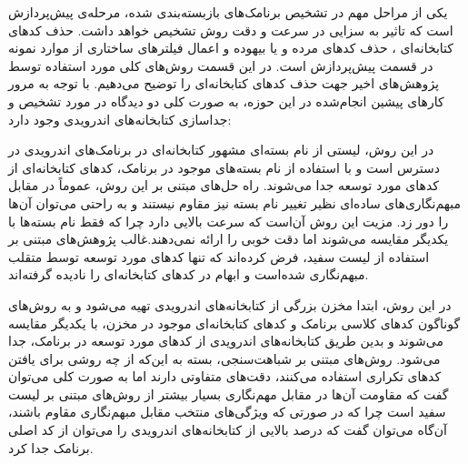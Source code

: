 یکی از مراحل مهم در تشخیص برنامک‌های بازبسته‌بندی شده، مرحله‌ی پیش‌پردازش  است که تاثیر به سزایی در سرعت و دقت روش تشخیص خواهد داشت. حذف کد‌های کتابخانه‌ای ، حذف کد‌های مرده و یا بیهوده و اعمال فیلتر‌های ساختاری از موارد نمونه در قسمت پیش‌پردازش است. در این قسمت روش‌های کلی مورد استفاده توسط پژوهش‌های اخیر جهت حذف کد‌های کتابخانه‌ای را توضیح می‌دهیم. با توجه به مرور کار‌های پیشین انجام‌شده در این حوزه، به صورت کلی دو دیدگاه در مورد تشخیص و جداسازی کتابخانه‌های اندرویدی وجود دارد:

  در این روش، لیستی از نام بسته‌ای مشهور کتابخانه‌ای در برنامک‌های اندرویدی در دسترس است و با استفاده از نام بسته‌های موجود در برنامک، کد‌های کتابخانه‌ای از کد‌های مورد توسعه جدا می‌شوند. راه‌ حل‌های مبتنی بر این روش، عموماً در مقابل مبهم‌نگاری‌های ساده‌ای نظیر تغییر نام بسته نیز مقاوم نیستند و به راحتی می‌توان آن‌ها را دور زد. مزیت این روش آن‌است که سرعت بالایی دارد چرا که فقط نام بسته‌ها با یکدیگر مقایسه می‌شوند اما دقت خوبی را ارائه نمی‌دهند.غالب پژوهش‌های مبتنی بر استفاده از لیست سفید، فرض کرده‌اند که تنها کد‌های مورد توسعه توسط متقلب مبهم‌نگاری شده‌است و ابهام در کد‌های کتابخانه‌ای را نادیده گرفته‌اند.

  در این روش، ابتدا مخزن بزرگی از کتابخانه‌های اندرویدی تهیه می‌شود و به روش‌های گوناگون کد‌های کلاسی برنامک و کد‌های کتابخانه‌ای موجود در مخزن، با یکدیگر مقایسه می‌شوند و بدین طریق کتابخانه‌های اندرویدی از کد‌های مورد توسعه در برنامک، جدا می‌شود. روش‌های مبتنی بر شباهت‌سنجی، بسته به این‌که از چه روشی برای یافتن کد‌های تکراری استفاده می‌کنند، دقت‌های متفاوتی دارند اما به صورت کلی می‌توان گفت که مقاومت آن‌ها در مقابل مهم‌نگاری بسیار بیشتر از روش‌های مبتنی بر لیست سفید است چرا که در صورتی که ویژگی‌های منتخب مقابل مبهم‌نگاری مقاوم باشند، آن‌گاه می‌توان گفت که درصد بالایی از کتابخانه‌های اندرویدی را می‌توان از کد اصلی برنامک جدا کرد.


